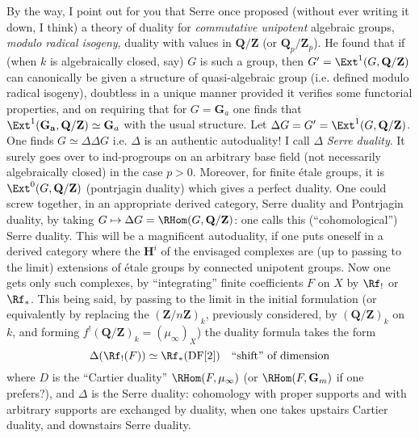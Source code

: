 By the way, I point out for you that Serre once proposed (without ever writing it down, I think) a theory of duality for \emph{commutative unipotent} algebraic groups, \emph{modulo radical isogeny}, duality with values in $\mathbf{Q}/\mathbf{Z}$ (or $\mathbf{Q}_p/\mathbf{Z}_p$). He found that if (when $k$ is algebraically closed, say) $G$ is such a group, then $G' = \Ext^1(G, \mathbf{Q}/\mathbf{Z})$ can canonically be given a structure of quasi-algebraic group (i.e. defined modulo radical isogeny), doubtless in a unique manner provided it verifies some functorial properties, and on requiring that for $G = \mathbf{G}_a$ one finds that $\Ext^1(\mathbf{G_a}, \mathbf{Q}/\mathbf{Z}) \simeq \mathbf{G}_a$ with the usual structure. Let $\Delta G = G' = \Ext^1(G, \mathbf{Q}/\mathbf{Z})$. One finds $G \simeq \Delta\Delta G$ i.e. $\Delta$ is an authentic autoduality! I call $\Delta$ \emph{Serre duality}. It surely goes over to ind-progroups on an arbitrary base field (not necessarily algebraically closed) in the case $p > 0$. Moreover, for finite étale groups, it is $\Ext^0(G, \mathbf{Q}/\mathbf{Z})$ (pontrjagin duality) which gives a perfect duality. One could screw together, in an appropriate derived category, Serre duality and Pontrjagin duality, by taking $G \mapsto \Delta G = \RHom(G, \mathbf{Q}/\mathbf{Z})$: one calls this (``cohomological'') Serre duality. This will be a magnificent autoduality, if one puts oneself in a derived category where the $\mathbf{H}^i$ of the envisaged complexes are (up to passing to the limit) extensions of étale groups by connected unipotent groups. Now one gets only such complexes, by ``integrating'' finite coefficients $F$ on $X$ by $\Rf_!$ or $\Rf_*$. This being said, by passing to the limit in the initial formulation (or equivalently by replacing the $(\mathbf{Z}/n\mathbf{Z})_k$, previously considered, by $(\mathbf{Q}/\mathbf{Z})_k$ on $k$, and forming $f^!(\mathbf{Q}/\mathbf{Z})_k = (\mu_\infty)_X$) the duality formula takes the form
$$
\Delta(\Rf_!(F)) \simeq \Rf_*(\text{DF}[2]) \quad \text{``shift'' of dimension}
$$
where $D$ is the ``Cartier duality'' $\RHom(F, \mu_\infty)$ (or $\RHom(F, \mathbf{G}_m)$ if one prefers?), and $\Delta$ is the Serre duality: cohomology with proper supports and with arbitrary supports are exchanged by duality, when one takes upstairs Cartier duality, and downstairs Serre duality.

